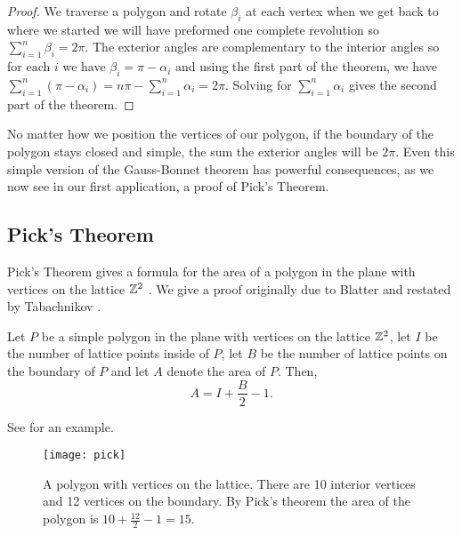 \begin{proof}

	We traverse a polygon and rotate $\beta_i$ at each vertex
	when we get back to where we started we will have preformed 
	one complete revolution so $\sum_{i=1}^n\beta_i=2\pi.$
	The exterior angles are complementary to the interior angles
	so for each $i$ we have $\beta_i=\pi-\alpha_i$  and using the first
	part of the theorem,  we have
	$\sum_{i=1}^n(\pi-\alpha_i)=n\pi -\sum_{i=1}^n\alpha_i=2\pi$. 
	Solving for $\sum_{i=1}^n\alpha_i$ gives the second part of the theorem.

\end{proof}
No matter how we position the vertices of our polygon,
if the boundary of the polygon stays closed and simple,
the sum the exterior angles will be $2\pi$.
Even this simple version of the Gauss-Bonnet theorem has powerful
consequences, as we now see in our first application, a proof of Pick's Theorem.





\subsection{Pick's Theorem}
\label{sec:pick}

Pick's Theorem gives a formula for the area of a polygon
in the plane with vertices on the lattice $\mathbb{Z}^2$ \cite{og-pick}.
We give a proof originally due to Blatter \cite{blatter_another_1997}
and restated by Tabachnikov  \cite{tabachnikov_proofs_2014}.

\begin{theorem}\label{thm:pick}
Let $P$ be a simple polygon in the plane with vertices on the lattice $\mathbb{Z}^2$,
let $I$ be the number of lattice points inside of $P$, let $B$ be the number
of lattice points on the boundary of $P$ and let $A$ denote the area of $P$.
Then, 
$$A=I+\frac{B}{2}-1.$$
\end{theorem}
See  for an example.

 \begin{figure}[htb]
         \centering
         \texttt{[image: pick]}
	\caption{A polygon with vertices on the lattice. 
	There are 10 interior vertices and 12 vertices on the boundary.
	By Pick's theorem the area of the polygon is $10+\frac{12}{2}-1=15.$
	\label{fig:picks}}
 \end{figure}
 
